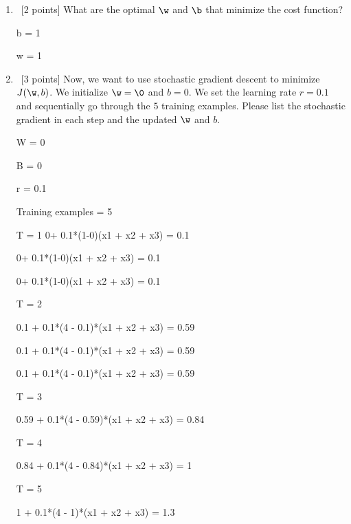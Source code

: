 \documentclass[12pt, fullpage,letterpaper]{article}
\begin{document}
\begin{enumerate}
\begin{enumerate}
\begin{enumerate}
	\end{enumerate}
	\item~[2 points] What are the optimal $\w$ and $\b$ that minimize the cost function? \newline

b = 1

w = 1

	\item~[3 points] Now, we want to use stochastic gradient descent to minimize $J(\w, b)$. We initialize $\w = \0$ and $b = 0$. We set the learning rate $r = 0.1$ and sequentially go through the $5$ training examples. Please list the stochastic gradient in each step and the updated $\w$ and $b$.  \newline

W = 0

B = 0

r = 0.1

Training examples = 5

T = 1
0+  0.1*(1-0)(x1 + x2 + x3) = 0.1

0+  0.1*(1-0)(x1 + x2 + x3) = 0.1

0+  0.1*(1-0)(x1 + x2 + x3) = 0.1

T = 2

0.1 + 0.1*(4 - 0.1)*(x1 + x2 + x3) = 0.59

0.1 + 0.1*(4 - 0.1)*(x1 + x2 + x3) = 0.59

0.1 + 0.1*(4 - 0.1)*(x1 + x2 + x3) = 0.59

T = 3


0.59 + 0.1*(4 - 0.59)*(x1 + x2 + x3) = 0.84

T = 4

0.84 + 0.1*(4 - 0.84)*(x1 + x2 + x3) = 1

T = 5

1 + 0.1*(4 - 1)*(x1 + x2 + x3) = 1.3



\end{enumerate}
\end{enumerate}
\end{document}
